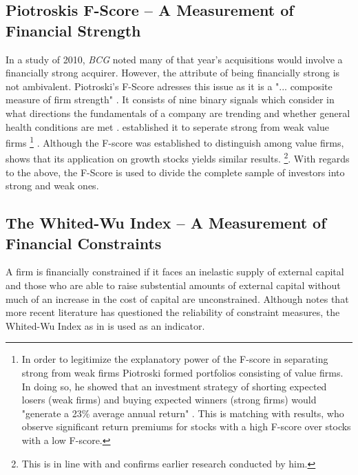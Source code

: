 \documentclass[12pt]{article}
\begin{document}
\subsection{Piotroskis F-Score -- A Measurement of Financial Strength}

In a study of 2010, \emph{BCG} noted many of that year's acquisitions would involve a financially strong acquirer. However, the attribute of being financially strong is not ambivalent. Piotroski's F-Score adresses this issue as it is a "... composite measure of firm strength" \citep[p. 496]{Fama2006}. It consists of nine binary signals which consider in what directions the fundamentals of a company are trending and whether general health conditions are met \citep{Mohr2012}. \citet{Piotroski2000} established it to seperate strong from weak value firms
	\footnote{In order to legitimize the explanatory power of the F-score in separating strong from weak firms Piotroski formed portfolios consisting of value firms. In doing so, he showed that an investment strategy of shorting expected losers (weak firms) and buying expected winners (strong firms) would "generate a 23\% average annual return" \citep[p. 4]{Piotroski2000}. This is matching with \citet{Hyde2014} results, who observe significant return premiums for stocks with a high F-score over stocks with a low F-score.}
. 
Although the F-score was established to distinguish among value firms, \citet{Mohr2012} shows that its application on growth stocks yields similar results.
	\footnote{This is in line with \citet{Piotroski2000} and confirms earlier research conducted by him.}. 
With regards to the above, the F-Score is used to divide the complete sample of investors into strong and weak ones.

\subsection{The Whited-Wu Index -- A Measurement of Financial Constraints}
A firm is financially constrained if it faces an inelastic supply of external capital \citep{Farre-mensa2013} and those who are able to raise substential amounts of external capital without much of an increase in the cost of capital are unconstrained. Although \citet{Khatami2014} notes that more recent literature has questioned the reliability of constraint measures, the Whited-Wu Index as in \citet{Liao2010} is used as an indicator. 
\end{document}
